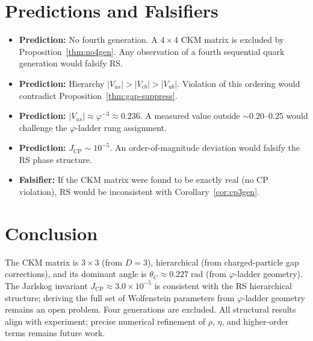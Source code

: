 \documentclass[12pt,a4paper]{article}
\theoremstyle{definition}
\theoremstyle{remark}
\begin{document}
\section{Predictions and Falsifiers}
\label{sec:falsifiers}

\begin{itemize}[noitemsep]
  \item \textbf{Prediction:} No fourth generation.  A $4 \times 4$
    CKM matrix is excluded by Proposition~\ref{thm:no4gen}.  Any
    observation of a fourth sequential quark generation would falsify
    RS.
  \item \textbf{Prediction:} Hierarchy $|V_{us}| > |V_{cb}| > |V_{ub}|$.
    Violation of this ordering would contradict
    Proposition~\ref{thm:gap-suppress}.
  \item \textbf{Prediction:} $|V_{us}| \approx \varphi^{-3} \approx 0.236$.
    A measured value outside $\sim 0.20$--$0.25$ would
    challenge the $\varphi$-ladder rung assignment.
  \item \textbf{Prediction:} $J_{\mathrm{CP}} \sim 10^{-5}$.  An order-of-magnitude
    deviation would falsify the RS phase structure.
  \item \textbf{Falsifier:} If the CKM matrix were found to be exactly
    real (no CP violation), RS would be inconsistent with
    Corollary~\ref{cor:cp3gen}.
\end{itemize}

\section{Conclusion}
\label{sec:conclusion}

The CKM matrix is $3 \times 3$ (from $D = 3$), hierarchical (from
charged-particle gap corrections), and its dominant angle is
$\theta_C \approx 0.227\;\mathrm{rad}$ (from $\varphi$-ladder
geometry).  The Jarlskog invariant $J_{\mathrm{CP}} \approx 3.0 \times
10^{-5}$ is consistent with the RS hierarchical structure; deriving
the full set of Wolfenstein parameters from $\varphi$-ladder geometry
remains an open problem.  Four
generations are excluded.  All structural results align with
experiment; precise numerical refinement of $\rho$, $\eta$, and
higher-order terms remains future work.
\end{document}
